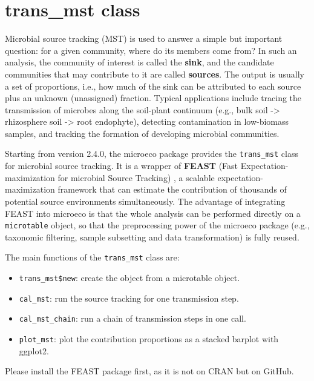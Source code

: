 \documentclass[
]{book}
\providecommand{\tightlist}{%
  \setlength{\itemsep}{0pt}\setlength{\parskip}{0pt}}
\begin{document}
\section{trans\_mst class}\label{trans_mst-class}

Microbial source tracking (MST) \citep{Shenhav_FEAST_2019} is used to answer a simple but important question:
for a given community, where do its members come from?
In such an analysis, the community of interest is called the \textbf{sink},
and the candidate communities that may contribute to it are called \textbf{sources}.
The output is usually a set of proportions, i.e., how much of the sink can be attributed
to each source plus an unknown (unassigned) fraction.
Typical applications include tracing the transmission of microbes along the soil-plant continuum
(e.g., bulk soil -\textgreater{} rhizosphere soil -\textgreater{} root endophyte), detecting contamination in low-biomass samples,
and tracking the formation of developing microbial communities.

Starting from version 2.4.0, the microeco package provides the \texttt{trans\_mst} class for microbial source tracking.
It is a wrapper of \textbf{FEAST} (Fast Expectation-maximization for microbial Source Tracking) \citep{Shenhav_FEAST_2019},
a scalable expectation-maximization framework that can estimate the contribution of thousands of
potential source environments simultaneously.
The advantage of integrating FEAST into microeco is that the whole analysis can be performed
directly on a \texttt{microtable} object, so that the preprocessing power of the microeco package
(e.g., taxonomic filtering, sample subsetting and data transformation) is fully reused.

The main functions of the \texttt{trans\_mst} class are:

\begin{itemize}
\tightlist
\item
  \texttt{trans\_mst\$new}: create the object from a microtable object.
\item
  \texttt{cal\_mst}: run the source tracking for one transmission step.
\item
  \texttt{cal\_mst\_chain}: run a chain of transmission steps in one call.
\item
  \texttt{plot\_mst}: plot the contribution proportions as a stacked barplot with ggplot2.
\end{itemize}

Please install the FEAST package first, as it is not on CRAN but on GitHub.
\end{document}
